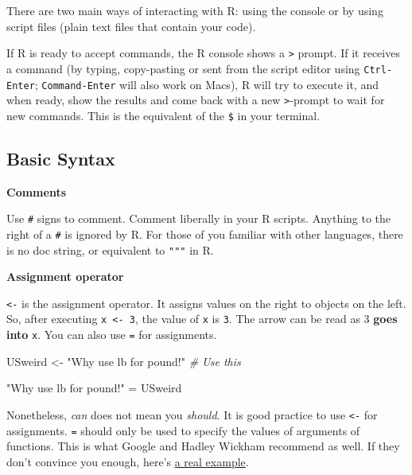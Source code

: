 \documentclass[
]{book}
\newenvironment{Shaded}{\begin{snugshade}}{\end{snugshade}}
\newcommand{\CommentTok}[1]{\textcolor[rgb]{0.56,0.35,0.01}{\textit{#1}}}
\newcommand{\NormalTok}[1]{#1}
\newcommand{\StringTok}[1]{\textcolor[rgb]{0.31,0.60,0.02}{#1}}
\begin{document}
There are two main ways of interacting with R: using the console or by using script files (plain text files that contain your code).

If R is ready to accept commands, the R console shows a \texttt{\textgreater{}} prompt. If it receives a command (by typing, copy-pasting or sent from the script editor using \texttt{Ctrl-Enter}; \texttt{Command-Enter} will also work on Macs), R will try to execute it, and when ready, show the results and come back with a new \texttt{\textgreater{}}-prompt to wait for new commands. This is the equivalent of the \texttt{\$} in your terminal.

\hypertarget{basic-syntax}{%
\subsection{Basic Syntax}\label{basic-syntax}}

\textbf{Comments}

Use \texttt{\#} signs to comment. Comment liberally in your R scripts. Anything to the right of a \texttt{\#} is ignored by R. For those of you familiar with other languages, there is no doc string, or equivalent to \texttt{"""} in R.

\textbf{Assignment operator}

\texttt{\textless{}-} is the assignment operator. It assigns values on the right to objects on the left. So, after executing \texttt{x\ \textless{}-\ 3}, the value of \texttt{x} is \texttt{3}. The arrow can be read as 3 \textbf{goes into} \texttt{x}. You can also use \texttt{=} for assignments.

\begin{Shaded}
\begin{Highlighting}[]
\NormalTok{USweird \textless{}{-}}\StringTok{ "Why use lb for pound!"} \CommentTok{\# Use this}

\StringTok{"Why use lb for pound!"}\NormalTok{ =}\StringTok{ }\NormalTok{USweird}
\end{Highlighting}
\end{Shaded}

Nonetheless, \emph{can} does not mean you \emph{should}. It is good practice to use \texttt{\textless{}-} for assignments. \texttt{=} should only be used to specify the values of arguments of functions. This is what Google and Hadley Wickham recommend as well. If they don't convince you enough, here's \href{https://csgillespie.wordpress.com/2010/11/16/assignment-operators-in-r-vs/}{a real example}.
\end{document}
